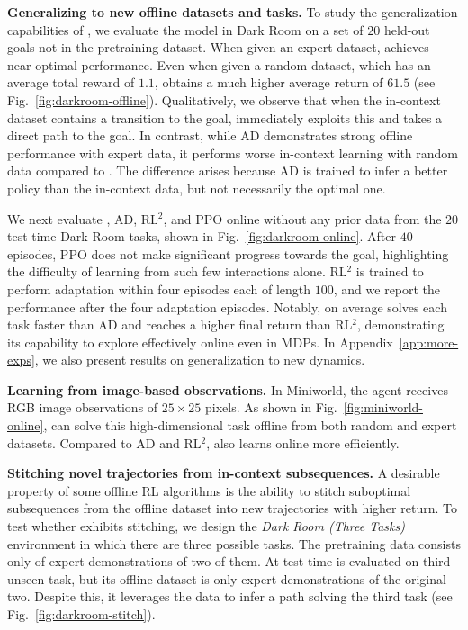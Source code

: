 \documentclass{article}
\begin{document}
\textbf{Generalizing to new offline datasets and tasks.} To study the generalization capabilities of \macroName{}, we evaluate the model in Dark Room on a set of $20$ held-out goals not in the pretraining dataset. When given an expert dataset, \macroName{} achieves near-optimal performance. Even when given a random dataset, which has an average total reward of $1.1$, \macroName{} obtains a much higher average return of $61.5$ (see Fig.~\ref{fig:darkroom-offline}). Qualitatively, we observe that when the in-context dataset contains a transition to the goal, \macroName{} immediately exploits this and takes a direct path to the goal. In contrast, while AD demonstrates strong offline performance with expert data, it performs worse in-context learning with random data compared to \macroName{}. The difference arises because AD is trained to infer a better policy than the in-context data, but not necessarily the optimal one.

We next evaluate \macroName{}, AD, RL$^2$, and PPO online without any prior data from the $20$ test-time Dark Room tasks, shown in Fig.~\ref{fig:darkroom-online}. After $40$ episodes, PPO does not make significant progress towards the goal, highlighting the difficulty of learning from such few interactions alone. RL$^2$ is trained to perform adaptation within four episodes each of length $100$, and we report the performance after the four adaptation episodes. Notably, \macroName{} on average solves each task faster than AD and reaches a higher final return than RL$^2$, demonstrating its capability to explore effectively online even in MDPs.
In Appendix~\ref{app:more-exps}, we also present results on generalization to new dynamics.

\textbf{Learning from image-based observations.} In Miniworld, the agent receives RGB image observations of $25 \times 25$ pixels. As shown in Fig.~\ref{fig:miniworld-online}, \macroName{} can solve this high-dimensional task offline from both random and expert datasets. Compared to AD and RL$^2$, \macroName{} also learns online more efficiently.



\textbf{Stitching novel trajectories from in-context subsequences.} A desirable property of some offline RL algorithms is the ability to stitch suboptimal subsequences from the offline dataset into new trajectories with higher return. To test whether \macroName{} exhibits stitching, we design the \emph{Dark Room (Three Tasks)} environment in which there are three possible tasks. The pretraining data consists only of expert demonstrations of two of them. At test-time \macroName{} is evaluated on third unseen task, but its offline dataset is only expert demonstrations of the original two. Despite this, it leverages the data to infer a path solving the third task (see Fig.~\ref{fig:darkroom-stitch}).
\end{document}
